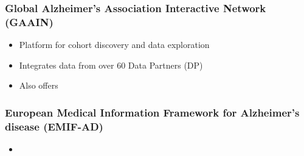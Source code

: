 \documentclass[10pt,xcolor=table]{beamer}
\begin{document}
\begin{frame}
\frametitle{Global Alzheimer's Association Interactive Network (GAAIN)}

\begin{itemize}
 \item Platform for cohort discovery and data exploration
 \item Integrates data from over 60 Data Partners (DP)
 \item Also offers 
\end{itemize}


\end{frame}

\begin{frame}
\frametitle{European Medical Information Framework for Alzheimer’s disease (EMIF-AD)}

\begin{itemize}
 \item 
\end{itemize}



\end{frame}

\fontsize{6pt}{7.2}\selectfont
{}

% 
% 


 
\end{document}
